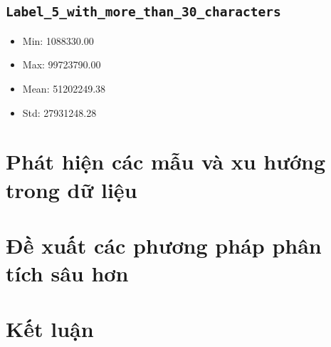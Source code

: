 \documentclass[12pt]{article}
\begin{document}
\subsection{\texttt{Label\_5\_with\_more\_than\_30\_characters}}
\begin{itemize}
    \item Min: 1088330.00
    \item Max: 99723790.00
    \item Mean: 51202249.38
    \item Std: 27931248.28
\end{itemize}

\section{Phát hiện các mẫu và xu hướng trong dữ liệu}

\lipsum[1-2]

\section{Đề xuất các phương pháp phân tích sâu hơn}

\lipsum[3-4]

\section{Kết luận}

\lipsum[5]
\end{document}
